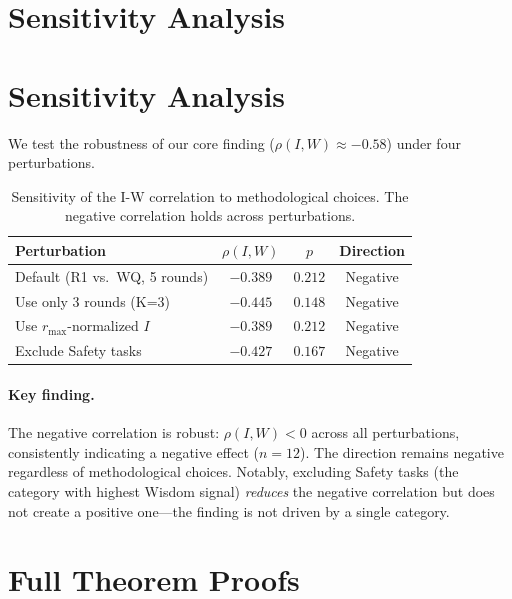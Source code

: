 \documentclass{article}
\begin{document}
\section{Sensitivity Analysis}
\label{app:sensitivity}
\section{Sensitivity Analysis}
\label{sec:sensitivity}

We test the robustness of our core finding ($\rho(I,W) \approx -0.58$) under
four perturbations.

\begin{table}[t]
\centering
\caption{Sensitivity of the I-W correlation to methodological choices.
  The negative correlation holds across perturbations.}
\label{tab:sensitivity}
\small
\begin{tabular}{lccc}
\toprule
\textbf{Perturbation} & $\rho(I,W)$ & $p$ & \textbf{Direction} \\
\midrule
Default (R1 vs.\ WQ, 5 rounds) & $-0.389$ & $0.212$ & Negative \\
Use only 3 rounds (K=3) & $-0.445$ & $0.148$ & Negative \\
Use $r_{\max}$-normalized $I$ & $-0.389$ & $0.212$ & Negative \\
Exclude Safety tasks & $-0.427$ & $0.167$ & Negative \\
\bottomrule
\end{tabular}
\end{table}

\paragraph{Key finding.}
The negative correlation is robust: $\rho(I,W) < 0$ across all
perturbations, consistently indicating a negative effect ($n{=}12$).
The direction remains negative regardless of methodological choices.
Notably, excluding Safety tasks (the category with highest Wisdom signal)
\emph{reduces} the negative correlation but does not create a positive
one---the finding is not driven by a single category.



\section{Full Theorem Proofs}
\label{app:proofs}
\end{document}
